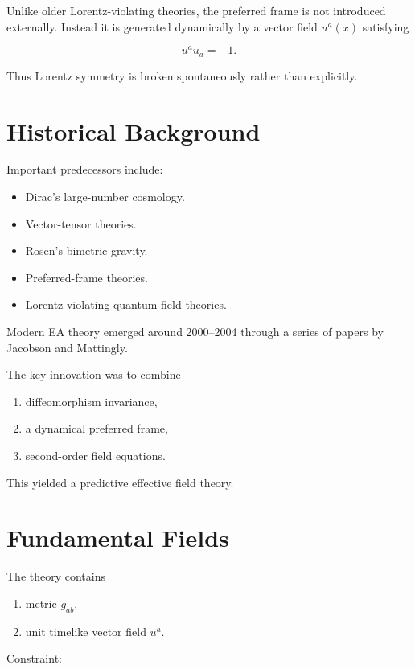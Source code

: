 Unlike older Lorentz-violating theories, the preferred frame is not
introduced externally.
Instead it is generated dynamically by a vector field
$u^a(x)$ satisfying

\begin{equation}
u^a u_a = -1.
\end{equation}

Thus Lorentz symmetry is broken spontaneously rather than explicitly.

\section{Historical Background}

Important predecessors include:

\begin{itemize}
\item Dirac's large-number cosmology.
\item Vector-tensor theories.
\item Rosen's bimetric gravity.
\item Preferred-frame theories.
\item Lorentz-violating quantum field theories.
\end{itemize}

Modern EA theory emerged around 2000--2004 through a series of papers by
Jacobson and Mattingly.

The key innovation was to combine

\begin{enumerate}
\item diffeomorphism invariance,
\item a dynamical preferred frame,
\item second-order field equations.
\end{enumerate}

This yielded a predictive effective field theory.

\section{Fundamental Fields}

The theory contains

\begin{enumerate}
\item metric $g_{ab}$,
\item unit timelike vector field $u^a$.
\end{enumerate}

Constraint:

